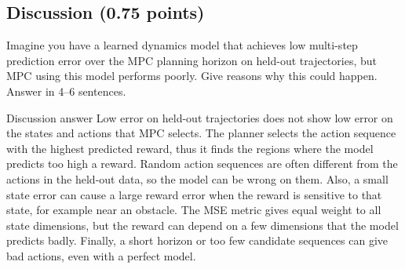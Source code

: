 \documentclass{article}
\begin{document}
\subsection*{Discussion (0.75 points)}
Imagine you have a learned dynamics model that achieves low multi-step prediction error over the MPC planning horizon on held-out trajectories, but MPC using this model performs poorly. Give reasons why this could happen. Answer in 4--6 sentences.
\begin{answer}{Discussion answer}
Low error on held-out trajectories does not show low error on the states and actions that MPC selects. The planner selects the action sequence with the highest predicted reward, thus it finds the regions where the model predicts too high a reward. Random action sequences are often different from the actions in the held-out data, so the model can be wrong on them. Also, a small state error can cause a large reward error when the reward is sensitive to that state, for example near an obstacle. The MSE metric gives equal weight to all state dimensions, but the reward can depend on a few dimensions that the model predicts badly. Finally, a short horizon or too few candidate sequences can give bad actions, even with a perfect model.
\end{answer}
\end{document}
